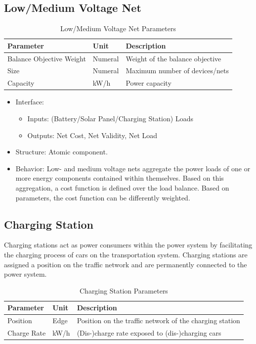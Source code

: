\subsection{Low/Medium Voltage Net}

	 \begin{table}[h]
	 	\renewcommand{\arraystretch}{1.3}
	 	\caption{Low/Medium Voltage Net Parameters}
	 	\centering
	 	\begin{tabular}{lll}
	 		\hline
	 		\textbf{Parameter}                    & \textbf{Unit} & \textbf{Description} \\ \hline
	 		Balance Objective Weight       & Numeral    & Weight of the balance objective  \\  
	 		Size                  	  & Numeral    & Maximum number of devices/nets      \\
	 		Capacity          & kW/h    & Power capacity      \\ \hline
	 	\end{tabular}
	 \end{table}

	\begin{itemize}
	\item Interface: 
	\begin{itemize}
		\item Inputs: (Battery/Solar Panel/Charging Station) Loads
		\item Outputs: Net Cost, Net Validity, Net Load
	\end{itemize}	
	\item Structure: Atomic component.
	\item Behavior: Low- and medium voltage nets aggregate the power loads of one or more energy components contained within themselves. Based on this aggregation, a cost function is defined over the load balance. 	Based on parameters, the cost function can be differently weighted. 
\end{itemize}

\subsection{Charging Station}
Charging stations act as power consumers within the power system by facilitating the charging process of cars on the transportation system. Charging stations are assigned a position on the traffic network and are permanently connected to the power system.

	 \begin{table}[h]
	 	\renewcommand{\arraystretch}{1.3}
	 	\caption{Charging Station Parameters}
	 	\centering
	 	\begin{tabular}{lll}
	 		\hline
	 		\textbf{Parameter}       & \textbf{Unit} & \textbf{Description} \\ \hline
	 		Position      			 & Edge    	     & Position on the traffic network of the charging station \\  
	 		Charge Rate         	 & kW/h    		 & (Dis-)charge rate exposed to (dis-)charging cars     \\ \hline
	 	\end{tabular}
	 \end{table}
	 

